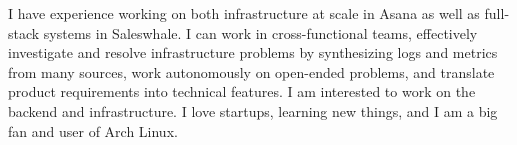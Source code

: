 

\begin{cvparagraph}

  I have experience working on both infrastructure at scale in Asana as well as full-stack systems in Saleswhale. I can work in cross-functional teams, effectively investigate and resolve infrastructure problems by synthesizing logs and metrics from many sources, work autonomously on open-ended problems, and translate product requirements into technical features. I am interested to work on the backend and infrastructure. I love startups, learning new things, and I am a big fan and user of Arch Linux.
\end{cvparagraph}

